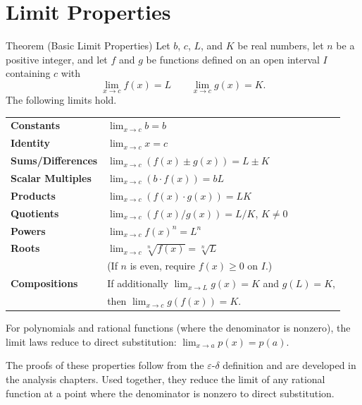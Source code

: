 \section{Limit Properties}

\begin{theorembox}{Theorem (Basic Limit Properties)}
Let $b$, $c$, $L$, and $K$ be real numbers, let $n$ be a positive
integer, and let $f$ and $g$ be functions defined on an open interval
$I$ containing $c$ with
\[
  \lim_{x \to c} f(x) = L \qquad \lim_{x \to c} g(x) = K.
\]
The following limits hold.

\medskip
\begin{tabular}{@{}p{}p{}@{}}
\textbf{Constants}        & $\displaystyle\lim_{x \to c} b = b$ \\[10pt]
\textbf{Identity}         & $\displaystyle\lim_{x \to c} x = c$ \\[10pt]
\textbf{Sums/Differences} & $\displaystyle\lim_{x \to c}(f(x) \pm g(x)) = L \pm K$ \\[10pt]
\textbf{Scalar Multiples} & $\displaystyle\lim_{x \to c}(b \cdot f(x)) = bL$ \\[10pt]
\textbf{Products}         & $\displaystyle\lim_{x \to c}(f(x) \cdot g(x)) = LK$ \\[10pt]
\textbf{Quotients}        & $\displaystyle\lim_{x \to c}(f(x)/g(x)) = L/K$, \quad $K \neq 0$ \\[10pt]
\textbf{Powers}           & $\displaystyle\lim_{x \to c} f(x)^n = L^n$ \\[10pt]
\textbf{Roots}            & $\displaystyle\lim_{x \to c} \sqrt[n]{f(x)} = \sqrt[n]{L}$ \\[4pt]
                          & (If $n$ is even, require $f(x) \geq 0$ on $I$.) \\[10pt]
\textbf{Compositions}     & If additionally $\displaystyle\lim_{x \to L} g(x) = K$ and $g(L) = K$, \\[6pt]
                          & then $\displaystyle\lim_{x \to c} g(f(x)) = K$. \\
\end{tabular}
\end{theorembox}

\begin{remark*}
For polynomials and rational functions (where the denominator is nonzero),
the limit laws reduce to direct substitution: $\lim_{x \to a} p(x) = p(a)$.
\end{remark*}

\begin{remark*}
The proofs of these properties follow from the $\varepsilon$-$\delta$
definition and are developed in the analysis chapters.
Used together, they reduce the limit of any rational function at a
point where the denominator is nonzero to direct substitution.
\end{remark*}
